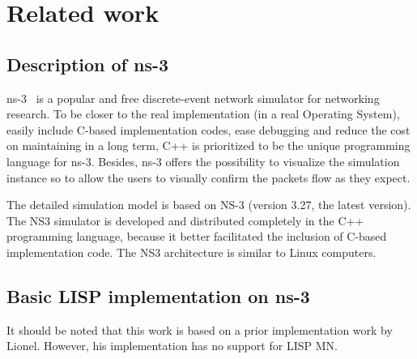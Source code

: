 \section{Related work}
\label{sec:ns3_related_work}
 \subsection{Description of ns-3}
 \label{sec:ns3_ns3}
 ns-3~\cite{ns3} is a popular and free discrete-event network simulator for networking research. To be closer to the real implementation (in a real Operating System), easily include C-based implementation codes, ease debugging and reduce the cost on maintaining in a long term, C++ is prioritized to be the unique programming language for ns-3. Besides, ns-3 offers the possibility to visualize the simulation instance so to allow the users to visually confirm the packets flow as they expect.



The detailed simulation model is based on NS-3 (version 3.27, the latest version). The NS3 simulator is developed and distributed completely in the C++ programming language, because it better facilitated the inclusion of C-based implementation code. The NS3 architecture is similar to Linux computers.

\subsection{Basic LISP implementation on ns-3}
\label{sec:ns3_basic_lisp}
It should be noted that this work is based on a prior implementation work by Lionel. However, his implementation has no support for LISP MN.


